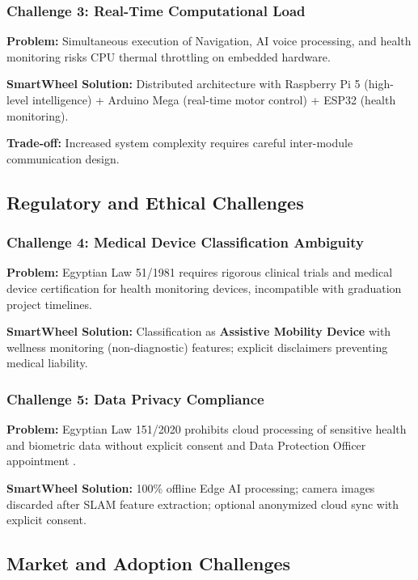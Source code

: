 \documentclass[12pt,a4paper]{report}
\begin{document}
\subsubsection{Challenge 3: Real-Time Computational Load}

\textbf{Problem:} Simultaneous execution of  Navigation, AI voice processing, and health monitoring risks CPU thermal throttling on embedded hardware.

\textbf{SmartWheel Solution:} Distributed architecture with Raspberry Pi 5 (high-level intelligence) + Arduino Mega (real-time motor control) + ESP32 (health monitoring).

\textbf{Trade-off:} Increased system complexity requires careful inter-module communication design.

\subsection{Regulatory and Ethical Challenges}

\subsubsection{Challenge 4: Medical Device Classification Ambiguity}

\textbf{Problem:} Egyptian Law 51/1981 requires rigorous clinical trials and medical device certification for health monitoring devices, incompatible with graduation project timelines.

\textbf{SmartWheel Solution:} Classification as \textbf{Assistive Mobility Device} with wellness monitoring (non-diagnostic) features; explicit disclaimers preventing medical liability.

\subsubsection{Challenge 5: Data Privacy Compliance}

\textbf{Problem:} Egyptian Law 151/2020 prohibits cloud processing of sensitive health and biometric data without explicit consent and Data Protection Officer appointment \cite{egypt_law_151}.

\textbf{SmartWheel Solution:} 100\% offline Edge AI processing; camera images discarded after SLAM feature extraction; optional anonymized cloud sync with explicit consent.

\subsection{Market and Adoption Challenges}
\end{document}
